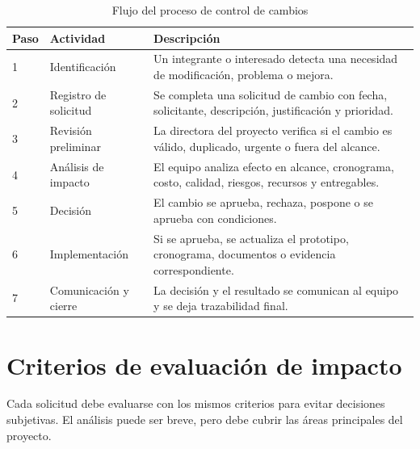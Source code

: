 \documentclass[11pt,spanish]{article}
\begin{document}
\begin{table}[H]
\centering
\caption{Flujo del proceso de control de cambios}
\label{tab:flujo-cambios}
{\small
\begin{tabularx}{\textwidth}{p{1.4cm} p{3.3cm} Y}
\toprule
\textbf{Paso} & \textbf{Actividad} & \textbf{Descripción} \\
 & Identificación & Un integrante o interesado detecta una necesidad de modificación, problema o mejora. \\
2 & Registro de solicitud & Se completa una solicitud de cambio con fecha, solicitante, descripción, justificación y prioridad. \\
3 & Revisión preliminar & La directora del proyecto verifica si el cambio es válido, duplicado, urgente o fuera del alcance. \\
4 & Análisis de impacto & El equipo analiza efecto en alcance, cronograma, costo, calidad, riesgos, recursos y entregables. \\
5 & Decisión & El cambio se aprueba, rechaza, pospone o se aprueba con condiciones. \\
6 & Implementación & Si se aprueba, se actualiza el prototipo, cronograma, documentos o evidencia correspondiente. \\
7 & Comunicación y cierre & La decisión y el resultado se comunican al equipo y se deja trazabilidad final. \\
\bottomrule
\end{tabularx}
}
\end{table}

\section{Criterios de evaluación de impacto}

Cada solicitud debe evaluarse con los mismos criterios para evitar decisiones subjetivas. El análisis puede ser breve, pero debe cubrir las áreas principales del proyecto.
\end{document}
